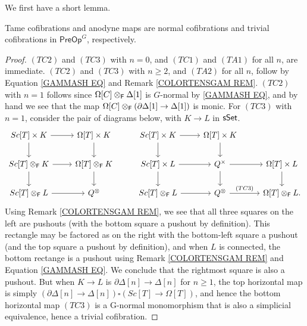 \documentclass[a4paper,10pt
,draft
]{article}%
\renewcommand{\1}{\eta}%
\begin{document}
We first have a short lemma.
\begin{lemma}
      \label{TAMECOFCOF_LEM}
      Tame cofibrations and anodyne maps are normal cofibrations and trivial cofibrations in $\mathsf{PreOp}^G$, respectively.
\end{lemma}
\begin{proof}
      $(TC2)$ and $(TC3)$ with $n = 0$, and $(TC1)$ and $(TA1)$ for all $n$, are immediate.
      $(TC2)$ and $(TC3)$ with $n \geq 2$, and $(TA2)$ for all $n$, follow by Equation \eqref{GAMMASH EQ} and Remark \ref{COLORTENSGAM REM}.
      $(TC2)$ with $n = 1$ follows since $\Omega[C] \otimes_{\mathsf{F}} \Delta[1]$ is $G$-normal by \eqref{GAMMASH EQ}, and by hand we see that the map $\Omega[C] \otimes_{\mathsf{F}}(\partial \Delta[1] \to \Delta[1])$ is monic.
      For $(TC3)$ with $n=1$, consider the pair of diagrams below, with $K \to L$ in $\mathsf{sSet}$.
      \[
            \begin{tikzcd}
                  Sc[T] \times K \arrow[d] \arrow[r]
                  &
                  \Omega[T] \times K \arrow[d]
                  & %
                  Sc[T] \times K \arrow[r] \arrow[d]
                  &
                  \Omega[T] \times K \arrow[d]
                  \\
                  Sc[T] \otimes_\Fin K \arrow[r] \arrow[d]
                  &
                  \Omega[T] \otimes_\Fin K \arrow[d]
                  & %
                  Sc[T] \times L \arrow[r] \arrow[d]
                  &
                  Q^\times \arrow[r] \arrow[d]
                  &
                  \Omega[T] \times L \arrow[d]
                  \\
                  Sc[T] \otimes_\Fin L \arrow[r]
                  &
                  Q^\otimes
                  & %
                  Sc[T] \otimes_\Fin L \arrow[r]
                  &
                  Q^\otimes \arrow[r, "{(TC3)}"]
                  &
                  \Omega[T] \otimes_\Fin L.
            \end{tikzcd}
      \]
      Using Remark \ref{COLORTENSGAM REM}, we see that all three squares on the left are pushouts (with the bottom square a pushout by definition).
      This rectangle may be factored as on the right with the bottom-left square a pushout (and the top square a pushout by definition),
      and when $L$ is connected, the bottom rectange is a pushout using Remark \ref{COLORTENSGAM REM} and Equation \eqref{GAMMASH EQ}.
      We conclude that the rightmost square is also a pushout.
      But when $K \to L$ is $\partial \Delta[n] \to \Delta[n]$ for $n \geq 1$,
      the top horizontal map is simply $(\partial \Delta[n] \to \Delta[n]) \square (Sc[T] \to \Omega[T])$,
      and hence the bottom horizontal map $(TC3)$ is a G-normal monomorphism that is also a simplicial equivalence, hence a trivial cofibration.
\end{proof}
\end{document}
